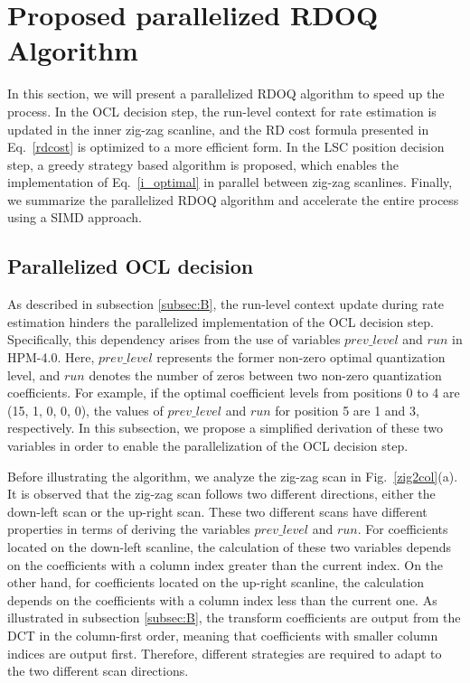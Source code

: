 \documentclass[lettersize,journal]{IEEEtran}
\begin{document}

\section{Proposed parallelized RDOQ Algorithm}
\label{sec:3}
In this section, we will present a parallelized RDOQ algorithm to speed up the process. In the OCL decision step, the run-level context for rate estimation is updated in the inner zig-zag scanline, and the RD cost formula presented in Eq.~\eqref{rdcost} is optimized to a more efficient form. In the LSC position decision step, a greedy strategy based algorithm is proposed, which enables the implementation of Eq.~\eqref{i_optimal} in parallel between zig-zag scanlines. Finally, we summarize the parallelized RDOQ algorithm and accelerate the entire process using a SIMD approach. 

\subsection{Parallelized OCL decision} 
\label{subsecOCL:B}
As described in subsection \ref{subsec:B}, the run-level context update during rate estimation hinders the parallelized implementation of the OCL decision step. Specifically, this dependency arises from the use of variables $prev\_level$ and $run$ in HPM-4.0. Here, $prev\_level$ represents the former non-zero optimal quantization level, and $run$ denotes the number of zeros between two non-zero quantization coefficients. For example, if the optimal coefficient levels from positions 0 to 4 are (15, 1, 0, 0, 0), the values of $prev\_level$ and $run$ for position 5 are 1 and 3, respectively. In this subsection, we propose a simplified derivation of these two variables in order to enable the parallelization of the OCL decision step. 

Before illustrating the algorithm, we analyze the zig-zag scan in Fig.~\ref{zig2col}(a). It is observed that the zig-zag scan follows two different directions, either the down-left scan or the up-right scan. These two different scans have different properties in terms of deriving the variables $prev\_level$ and $run$. For coefficients located on the down-left scanline, the calculation of these two variables depends on the coefficients with a column index greater than the current index. On the other hand, for coefficients located on the up-right scanline, the calculation depends on the coefficients with a column index less than the current one. As illustrated in subsection \ref{subsec:B}, the transform coefficients are output from the DCT in the column-first order, meaning that coefficients with smaller column indices are output first. Therefore, different strategies are required to adapt to the two different scan directions. 
\end{document}
